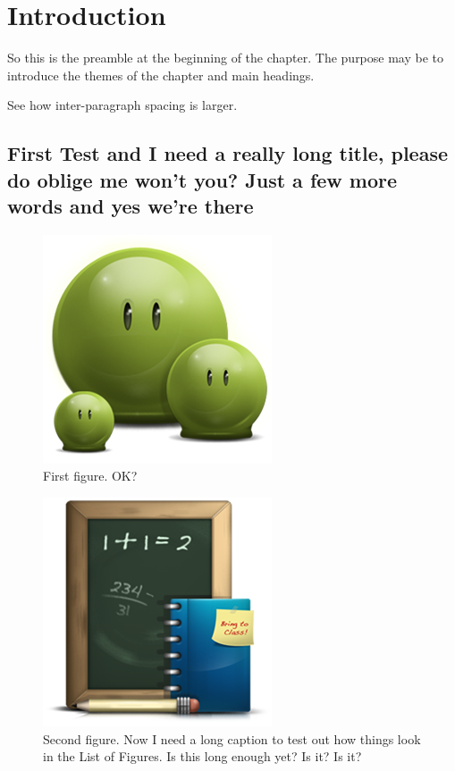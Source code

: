 \chapter{Introduction}

So this is the preamble at the beginning of the chapter. The purpose may be to introduce the themes of the chapter and main headings.

See how inter-paragraph spacing is larger. \lipsum[3]

\section{First Test and I need a really long title, please do oblige me won't you? Just a few more words and yes we're there}
\lipsum[1-2]

\begin{figure}[hbt!]\centering
\includegraphics[width=.3\textwidth]{green}
\caption{First figure. OK?}
\end{figure}

\begin{figure}[hbt!]\centering
\includegraphics[width=.3\textwidth]{school}
\caption{Second figure. Now I need a long caption to test out how things look in the List of Figures. Is this long enough yet? Is it? Is it?}
\end{figure}


